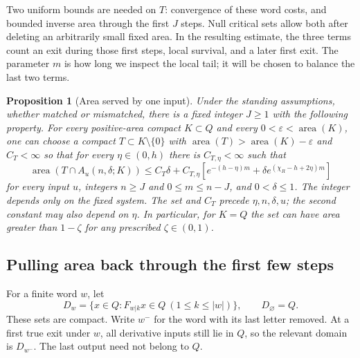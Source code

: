 \documentclass[11pt]{amsart}
\newtheorem{proposition}[theorem]{Proposition}
\theoremstyle{definition}
\theoremstyle{remark}
\newcommand{\area}{\operatorname{area}}
\numberwithin{equation}{section}
\begin{document}
Two uniform bounds are needed on $T$: convergence of these word
costs, and bounded inverse area through the first $J$ steps.
Null critical sets allow both after deleting an arbitrarily small
fixed area. In the resulting estimate, the three terms count
an exit during those first steps, local survival, and a later
first exit. The parameter $m$ is how long we inspect the local
tail; it will be chosen to balance the last two terms.

\begin{proposition}[Area served by one input]\label{thm:area}
Under the standing assumptions, whether matched or mismatched,
there is a fixed integer $J\ge1$ with
the following property. For every positive-area compact $K\subset Q$
and every $0<\varepsilon<\area(K)$,
one can choose a compact $T\subset K\setminus\{0\}$ with
$\area(T)>\area(K)-\varepsilon$ and $C_T<\infty$
so that for every $\eta\in(0,h)$ there is $C_{T,\eta}<\infty$
such that
\begin{equation}\label{eq:actualarea}
\area(T\cap A_u(n,\delta;K))\le C_T\delta+
C_{T,\eta}\left[e^{-(h-\eta)m}+\delta e^{(\chi_R-h+2\eta)m}\right]
\end{equation}
for every input $u$, integers $n\ge J$ and $0\le m\le n-J$,
and $0<\delta\le1$.
The integer depends only on the fixed system. The set and $C_T$
precede $\eta,n,\delta,u$; the second constant may also depend on $\eta$.
In particular, for $K=Q$ the set can have area greater than
$1-\zeta$ for any prescribed $\zeta\in(0,1)$.
\end{proposition}

\subsection{Pulling area back through the first few steps}
For a finite word \(w\), let
\begin{equation}\label{eq:feasibledomains}
D_w=\{x\in Q:F_{w|k}x\in Q\ (1\le k\le|w|)\},
\qquad D_\varnothing=Q.
\end{equation}
These sets are compact. Write \(w^-\) for the word with its last
letter removed. At a first true exit under \(w\), all derivative
inputs still lie in \(Q\), so the relevant domain is \(D_{w^-}\).
The last output need not belong to \(Q\).
\end{document}
